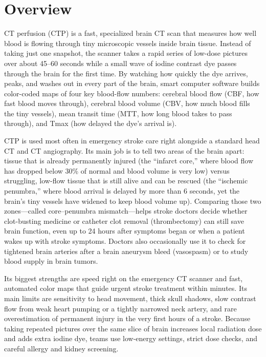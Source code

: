 \label{ch:infographic-ctp}

\section{Overview}

CT perfusion (CTP) is a fast, specialized brain CT scan that measures how well blood is flowing through tiny microscopic vessels inside brain tissue. Instead of taking just one snapshot, the scanner takes a rapid series of low-dose pictures over about 45--60 seconds while a small wave of iodine contrast dye passes through the brain for the first time. By watching how quickly the dye arrives, peaks, and washes out in every part of the brain, smart computer software builds color-coded maps of four key blood-flow numbers: cerebral blood flow (CBF, how fast blood moves through), cerebral blood volume (CBV, how much blood fills the tiny vessels), mean transit time (MTT, how long blood takes to pass through), and Tmax (how delayed the dye's arrival is).

CTP is used most often in emergency stroke care right alongside a standard head CT and CT angiography. Its main job is to tell two areas of the brain apart: tissue that is already permanently injured (the ``infarct core,'' where blood flow has dropped below 30\% of normal and blood volume is very low) versus struggling, low-flow tissue that is still alive and can be rescued (the ``ischemic penumbra,'' where blood arrival is delayed by more than 6 seconds, yet the brain's tiny vessels have widened to keep blood volume up). Comparing those two zones---called core--penumbra mismatch---helps stroke doctors decide whether clot-busting medicine or catheter clot removal (thrombectomy) can still save brain function, even up to 24 hours after symptoms began or when a patient wakes up with stroke symptoms. Doctors also occasionally use it to check for tightened brain arteries after a brain aneurysm bleed (vasospasm) or to study blood supply in brain tumors.

Its biggest strengths are speed right on the emergency CT scanner and fast, automated color maps that guide urgent stroke treatment within minutes. Its main limits are sensitivity to head movement, thick skull shadows, slow contrast flow from weak heart pumping or a tightly narrowed neck artery, and rare overestimation of permanent injury in the very first hours of a stroke. Because taking repeated pictures over the same slice of brain increases local radiation dose and adds extra iodine dye, teams use low-energy settings, strict dose checks, and careful allergy and kidney screening.


